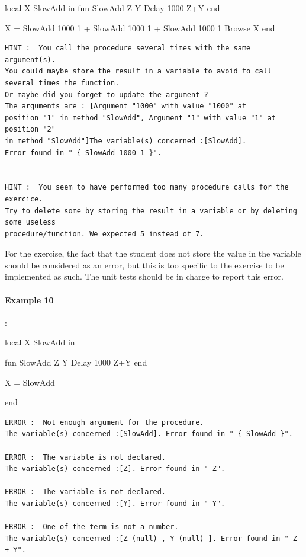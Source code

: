 \documentclass[11pt,a4paper,twoside,openright]{report}
\begin{document}
\begin{OZ}
local X SlowAdd in 
  fun {SlowAdd Z Y}
	   	{Delay 1000}
   		Z+Y   		
	end

	X = {SlowAdd 1000 1} + {SlowAdd 1000 1} + {SlowAdd 1000 1}
    {Browse X}
end
\end{OZ}

\begin{lstlisting}
HINT :  You call the procedure several times with the same argument(s). 
You could maybe store the result in a variable to avoid to call several times the function. 
Or maybe did you forget to update the argument ? 
The arguments are : [Argument "1000" with value "1000" at 
position "1" in method "SlowAdd", Argument "1" with value "1" at position "2" 
in method "SlowAdd"]The variable(s) concerned :[SlowAdd]. 
Error found in " { SlowAdd 1000 1 }".


HINT :  You seem to have performed too many procedure calls for the exercice. 
Try to delete some by storing the result in a variable or by deleting some useless 
procedure/function. We expected 5 instead of 7.

\end{lstlisting}

For the exercise, the fact that the student does not store the value in the variable
should be considered as an error, but this is too specific to the exercise to be
implemented as such. The unit tests should be in charge to report this error.

\paragraph{Example 10}:

\begin{OZ}
local X SlowAdd in 
	
	fun {SlowAdd Z Y}
	   	{Delay 1000}
   		Z+Y   		
	end

    X = {SlowAdd}

end
\end{OZ}

\begin{lstlisting}
ERROR :  Not enough argument for the procedure. 
The variable(s) concerned :[SlowAdd]. Error found in " { SlowAdd }".

ERROR :  The variable is not declared. 
The variable(s) concerned :[Z]. Error found in " Z".

ERROR :  The variable is not declared. 
The variable(s) concerned :[Y]. Error found in " Y".

ERROR :  One of the term is not a number. 
The variable(s) concerned :[Z (null) , Y (null) ]. Error found in " Z + Y".

\end{lstlisting}
\end{document}
